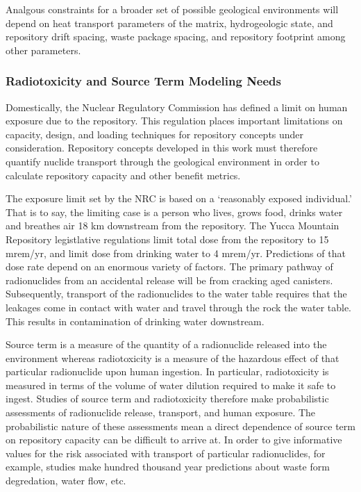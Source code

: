 Analgous constraints for a broader set of possible geological 
environments will depend on heat transport parameters of the matrix, 
hydrogeologic state, and repository drift spacing, waste package 
spacing, and repository footprint among other parameters. 

\subsubsection{Radiotoxicity and Source Term Modeling Needs}

Domestically, the Nuclear Regulatory Commission has defined a limit on  
human exposure due to the repository. This regulation places important 
limitations on capacity, design, and loading techniques for repository 
concepts under consideration. Repository concepts developed in this 
work must therefore quantify nuclide transport through the geological 
environment in order to calculate repository capacity and other 
benefit metrics. 

The exposure limit set by the NRC is based on a `reasonably exposed 
individual.' That is to say, the limiting case is a person who lives, 
grows food, drinks water and breathes air 18 km downstream from the 
repository. The Yucca Mountain Repository legistlative regulations 
limit total dose from the repository to 15 mrem/yr, and limit dose 
from drinking water to 4 mrem/yr.  Predictions of that dose rate 
depend on an enormous variety of factors. The primary pathway of 
radionuclides from an accidental release will be from cracking aged 
canisters. Subsequently, transport of the radionuclides to the water 
table requires that the leakages come in contact with water and travel 
through the rock the water table. This results in contamination of 
drinking water downstream.  

Source term is a measure of the quantity of a radionuclide released 
into the environment whereas radiotoxicity is a measure of the 
hazardous effect of that particular radionuclide upon human ingestion.  
In particular, radiotoxicity is measured in terms of the volume of 
water dilution required to make it safe to ingest. Studies of source 
term and radiotoxicity therefore make probabilistic assessments of 
radionuclide release, transport, and human exposure.  The 
probabilistic nature of these assessments mean a direct dependence of 
source term on repository capacity can be difficult to arrive at. In 
order to give informative values for the risk associated with 
transport of particular radionuclides, for example, studies make 
hundred thousand year predictions about waste form degredation, water 
flow, etc.  

